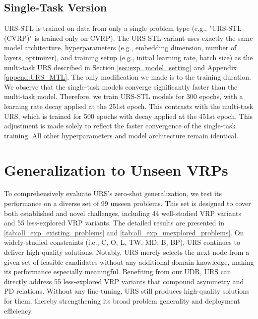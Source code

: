 \documentclass{article}
\theoremstyle{plain}
\theoremstyle{definition}
\theoremstyle{remark}
\begin{document}
\subsection{Single-Task Version}
\label{append:URS_STL}
URS-STL is trained on data from only a single problem type (e.g., "URS-STL (CVRP)" is trained only on CVRP). The URS-STL variant uses exactly the same model architecture, hyperparameters (e.g., embedding dimension, number of layers, optimizer), and training setup (e.g., initial learning rate, batch size) as the multi-task URS described in Section \ref{sec:exp_model_setting} and Appendix \ref{append:URS_MTL}. The only modification we made is to the training duration. We observe that the single-task models converge significantly faster than the multi-task model. Therefore, we train URS-STL models for 300 epochs, with a learning rate decay applied at the 251st epoch. This contrasts with the multi-task URS, which is trained for 500 epochs with decay applied at the 451st epoch. This adjustment is made solely to reflect the faster convergence of the single-task training. All other hyperparameters and model architecture remain identical. 

\section{Generalization to Unseen VRPs}
\label{append:experiments}
To comprehensively evaluate URS's zero-shot generalization, we test its performance on a diverse set of 99 unseen problems. This set is designed to cover both established and novel challenges, including 44 well-studied VRP variants and 55 less-explored VRP variants. The detailed results are presented in \cref{tab:all_exp_existing_problems} and \cref{tab:all_exp_unexplored_problems}. On widely-studied constraints (i.e., C, O, L, TW, MD, B, BP), URS continues to deliver high-quality solutions. Notably, URS merely selects the next node from a given set of feasible candidates without any additional domain knowledge, making its performance especially meaningful. Benefiting from our UDR, URS can directly address 55 less-explored VRP variants that compound asymmetry and PD relations. Without any fine-tuning, URS still produces high-quality solutions for them, thereby strengthening its broad problem generality and deployment efficiency.
\end{document}
